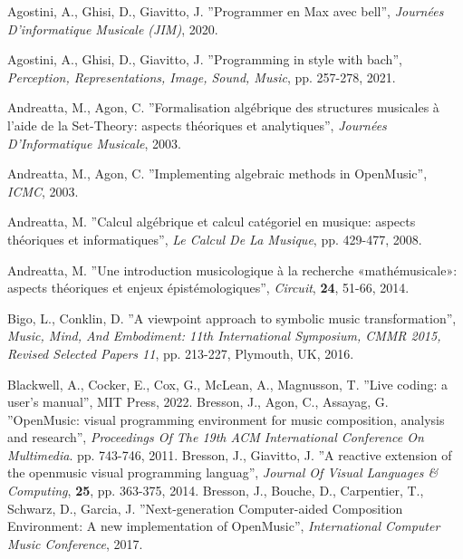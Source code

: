 \documentclass{article}
\begin{document}
\begin{thebibliography}{2}
  Agostini, A., Ghisi, D., Giavitto, J. ''Programmer en Max avec bell'',
  {\em Journées D'informatique Musicale (JIM)}, 2020.

   Agostini, A., Ghisi, D., Giavitto, J. ''Programming in style with bach'',
   {\em Perception, Representations, Image, Sound, Music}, pp. 257-278, 2021.

  Andreatta, M., Agon, C. ''Formalisation algébrique des structures musicales à l'aide de la Set-Theory: aspects théoriques et analytiques'',
  {\em Journées D'Informatique Musicale}, 2003.

  Andreatta, M., Agon, C.
  ''Implementing algebraic methods in OpenMusic'',
  {\em ICMC}, 2003.

  Andreatta, M.
  ''Calcul algébrique et calcul catégoriel en musique: aspects théoriques et informatiques'',
  {\em Le Calcul De La Musique}, pp. 429-477, 2008.

  Andreatta, M.
  ''Une introduction musicologique à la recherche «mathémusicale»: aspects théoriques et enjeux épistémologiques'',
  {\em Circuit}, \textbf{24}, 51-66, 2014.

  Bigo, L., Conklin, D.
  ''A viewpoint approach to symbolic music transformation'',
  {\em Music, Mind, And Embodiment: 11th International Symposium, CMMR 2015, Revised Selected Papers 11}, pp. 213-227, Plymouth, UK, 2016.

  Blackwell, A., Cocker, E., Cox, G., McLean, A., Magnusson, T.
  ''Live coding: a user's manual'',
  MIT Press, 2022.
  Bresson, J., Agon, C., Assayag, G.
  ''OpenMusic: visual programming environment for music composition, analysis and research'',
  {\em Proceedings Of The 19th ACM International Conference On Multimedia}. pp. 743-746, 2011.
  Bresson, J., Giavitto, J.
  ''A reactive extension of the openmusic visual programming languag'',
  {\em Journal Of Visual Languages \& Computing}, \textbf{25}, pp. 363-375, 2014.
  Bresson, J., Bouche, D., Carpentier, T., Schwarz, D., Garcia, J.
  ''Next-generation Computer-aided Composition Environment: A new implementation of OpenMusic'',
   {\em International Computer Music Conference}, 2017.


\end{thebibliography}
\end{document}
